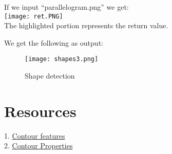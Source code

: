 \documentclass[]{article}
\begin{document}
If we input ``parallelogram.png'' we get:\\
\texttt{[image: ret.PNG]}\\
The highlighted portion represents the return value.

\newpage
We get the following as output:\\
\begin{figure}[h]
	\centering
	\texttt{[image: shapes3.png]}
	\caption{Shape detection}
\end{figure}

\section{Resources}\label{resources}

1. \href{http://opencv-python-tutroals.readthedocs.org/en/latest/py \\
\_tutorials/py\_imgproc/py\_contours/py\_contour\_features/py\\
\_contour\_features.html\#contour-features}{Contour features}\\
2. \href{http://docs.opencv.org/modules/imgproc/doc/structural\_analysis \\
\_and\_shape\_descriptors.html?highlight=findcontours\#arclength}{Contour Properties}
\end{document}
